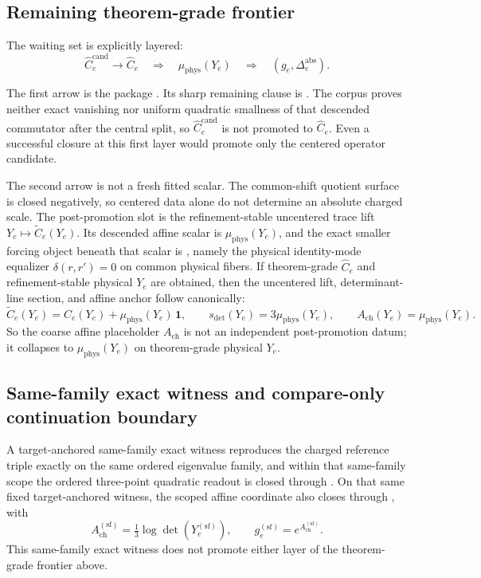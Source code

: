 \subsection{Remaining theorem-grade frontier}\label{133-why-q--23}

The waiting set is explicitly layered:
\[
\widehat C_e^{\mathrm{cand}}
\longrightarrow
\widehat C_e
\quad\Longrightarrow\quad
\mu_{\mathrm{phys}}(Y_e)
\quad\Longrightarrow\quad
(g_e,\Delta_e^{\mathrm{abs}}).
\]

The first arrow is the package . Its sharp remaining clause is
.
The corpus proves neither exact vanishing nor uniform quadratic smallness of that descended commutator after the central split, so \(\widehat C_e^{\mathrm{cand}}\) is not promoted to \(\widehat C_e\). Even a successful closure at this first layer would promote only the centered operator candidate.

The second arrow is not a fresh fitted scalar. The common-shift quotient surface is closed negatively, so centered data alone do not determine an absolute charged scale. The post-promotion slot is the refinement-stable uncentered trace lift \(Y_e\mapsto \widetilde C_e(Y_e)\). Its descended affine scalar is \(\mu_{\mathrm{phys}}(Y_e)\), and the exact smaller forcing object beneath that scalar is , namely the physical identity-mode equalizer \(\delta(r,r')=0\) on common physical fibers. If theorem-grade \(\widehat C_e\) and refinement-stable physical \(Y_e\) are obtained, then the uncentered lift, determinant-line section, and affine anchor follow canonically:
\[
\widetilde C_e(Y_e)=\widehat C_e(Y_e)+\mu_{\mathrm{phys}}(Y_e)\,\mathbf 1,
\qquad
s_{\det}(Y_e)=3\mu_{\mathrm{phys}}(Y_e),
\qquad
A_{\mathrm{ch}}(Y_e)=\mu_{\mathrm{phys}}(Y_e).
\]
So the coarse affine placeholder \(A_{\mathrm{ch}}\) is not an independent post-promotion datum; it collapses to \(\mu_{\mathrm{phys}}(Y_e)\) on theorem-grade physical \(Y_e\).

\subsection{Same-family exact witness and compare-only continuation boundary}\label{134-the-koide-phase-from-oph}

A target-anchored same-family exact witness reproduces the charged reference triple exactly on the same ordered eigenvalue family, and within that same-family scope the ordered three-point quadratic readout is closed through . On that same fixed target-anchored witness, the scoped affine coordinate also closes through , with
\[
A_{\mathrm{ch}}^{(\mathrm{sf})}
=
\tfrac13\log\det(Y_e^{(\mathrm{sf})}),
\qquad
g_e^{(\mathrm{sf})}
=
e^{A_{\mathrm{ch}}^{(\mathrm{sf})}}.
\]
This same-family exact witness does not promote either layer of the theorem-grade frontier above.

